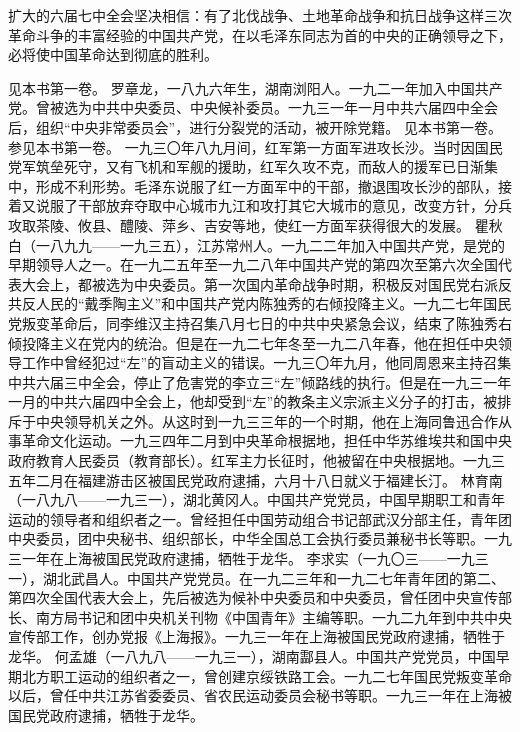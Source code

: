 扩大的六届七中全会坚决相信：有了北伐战争、土地革命战争和抗日战争这样三次革命斗争的丰富经验的中国共产党，在以毛泽东同志为首的中央的正确领导之下，必将使中国革命达到彻底的胜利。


\begin{maonote}
见本书第一卷。
罗章龙，一八九六年生，湖南浏阳人。一九二一年加入中国共产党。曾被选为中共中央委员、中央候补委员。一九三一年一月中共六届四中全会后，组织“中央非常委员会”，进行分裂党的活动，被开除党籍。
见本书第一卷。
参见本书第一卷。
一九三〇年八九月间，红军第一方面军进攻长沙。当时因国民党军筑垒死守，又有飞机和军舰的援助，红军久攻不克，而敌人的援军已日渐集中，形成不利形势。毛泽东说服了红一方面军中的干部，撤退围攻长沙的部队，接着又说服了干部放弃夺取中心城市九江和攻打其它大城市的意见，改变方针，分兵攻取茶陵、攸县、醴陵、萍乡、吉安等地，使红一方面军获得很大的发展。
瞿秋白（一八九九——一九三五），江苏常州人。一九二二年加入中国共产党，是党的早期领导人之一。在一九二五年至一九二八年中国共产党的第四次至第六次全国代表大会上，都被选为中央委员。第一次国内革命战争时期，积极反对国民党右派反共反人民的“戴季陶主义”和中国共产党内陈独秀的右倾投降主义。一九二七年国民党叛变革命后，同李维汉主持召集八月七日的中共中央紧急会议，结束了陈独秀右倾投降主义在党内的统治。但是在一九二七年冬至一九二八年春，他在担任中央领导工作中曾经犯过“左”的盲动主义的错误。一九三〇年九月，他同周恩来主持召集中共六届三中全会，停止了危害党的李立三“左”倾路线的执行。但是在一九三一年一月的中共六届四中全会上，他却受到“左”的教条主义宗派主义分子的打击，被排斥于中央领导机关之外。从这时到一九三三年的一个时期，他在上海同鲁迅合作从事革命文化运动。一九三四年二月到中央革命根据地，担任中华苏维埃共和国中央政府教育人民委员（教育部长）。红军主力长征时，他被留在中央根据地。一九三五年二月在福建游击区被国民党政府逮捕，六月十八日就义于福建长汀。
林育南（一八九八——一九三一），湖北黄冈人。中国共产党党员，中国早期职工和青年运动的领导者和组织者之一。曾经担任中国劳动组合书记部武汉分部主任，青年团中央委员，团中央秘书、组织部长，中华全国总工会执行委员兼秘书长等职。一九三一年在上海被国民党政府逮捕，牺牲于龙华。
李求实（一九〇三——一九三一），湖北武昌人。中国共产党党员。在一九二三年和一九二七年青年团的第二、第四次全国代表大会上，先后被选为候补中央委员和中央委员，曾任团中央宣传部长、南方局书记和团中央机关刊物《中国青年》主编等职。一九二九年到中共中央宣传部工作，创办党报《上海报》。一九三一年在上海被国民党政府逮捕，牺牲于龙华。
何孟雄（一八九八——一九三一），湖南酃县人。中国共产党党员，中国早期北方职工运动的组织者之一，曾创建京绥铁路工会。一九二七年国民党叛变革命以后，曾任中共江苏省委委员、省农民运动委员会秘书等职。一九三一年在上海被国民党政府逮捕，牺牲于龙华。

\end{maonote}
